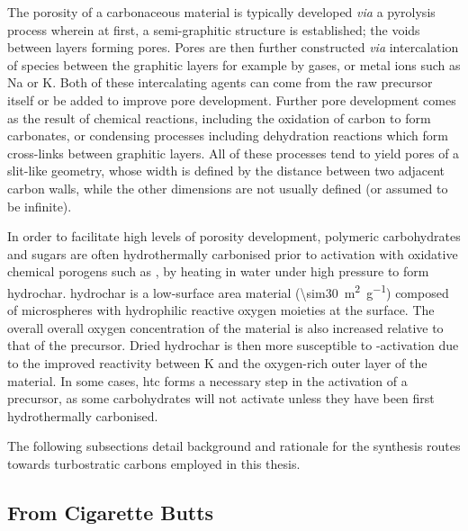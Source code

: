 The porosity of a carbonaceous material is typically developed \textit{via} a pyrolysis process wherein at first, a semi-graphitic structure is established; the voids between layers forming pores. Pores are then further constructed  \textit{via} intercalation of species between the graphitic layers for example by gases,\citep{Gonzalez2009} or metal ions such as Na or K.\citep{Sevilla2014Energy, Osswald2009Porosity, Wang2012KOH, RuizFernandez2011} Both of these intercalating agents can come from the raw precursor itself or be added to improve pore development. Further pore development comes as the result of chemical reactions, including the oxidation of carbon to form carbonates, or condensing processes including dehydration reactions which form cross-links between graphitic layers.\citep{Sevilla2014Energy, Wang2012KOH, Prahas2008} All of these processes tend to yield pores of a slit-like geometry, whose width is defined by the distance between two adjacent carbon walls, while the other dimensions are not usually defined (or assumed to be infinite).\citep{Sevilla2019, Everett1976Adsorption}

In order to facilitate high levels of porosity development, polymeric carbohydrates and sugars are often hydrothermally carbonised prior to activation with oxidative chemical \glspl{porogen} such as , by heating in water under high pressure to form \gls{hydrochar}. \Gls{hydrochar} is a low-surface area material (\qty{\sim30}{\metre\squared\per\gram}) composed of microspheres with hydrophilic reactive oxygen moieties at the surface. The overall overall oxygen concentration of the material is also increased relative to that of the precursor.\citep{Titirici2010Chemistry, Sevilla2011High} Dried \gls{hydrochar} is then more susceptible to -activation due to the improved reactivity between K and the oxygen-rich outer layer of the material.\citep{Sevilla2011High, Sevilla2009Chemical} In some cases, \gls{htc} forms a necessary step in the activation of a precursor, as some carbohydrates will not activate unless they have been first hydrothermally carbonised.\citep{Ares2014}

The following subsections detail background and rationale for the synthesis routes towards \glspl{turbostratic carbon} employed in this thesis.

\subsection{From Cigarette Butts}\label{ss:cbs}

